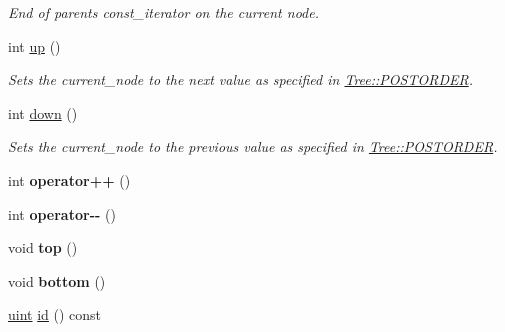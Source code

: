 \begin{DoxyCompactItemize}
\begin{DoxyCompactList}\small\item\em End of parents {\ttfamily const\+\_\+iterator} on the current node. \end{DoxyCompactList}\item 
int \hyperlink{classTreeIterator_adca1d999f093a69e2f5d044b358e5da7}{up} ()\hypertarget{classTreeIterator_adca1d999f093a69e2f5d044b358e5da7}{}\label{classTreeIterator_adca1d999f093a69e2f5d044b358e5da7}

\begin{DoxyCompactList}\small\item\em Sets the {\ttfamily current\+\_\+node} to the next value as specified in \hyperlink{classTree_a310e76b803db38e7067514822b21a58f}{Tree\+::\+P\+O\+S\+T\+O\+R\+D\+ER}. \end{DoxyCompactList}\item 
int \hyperlink{classTreeIterator_a8534adba213df8f7f1e67bf5005d902e}{down} ()\hypertarget{classTreeIterator_a8534adba213df8f7f1e67bf5005d902e}{}\label{classTreeIterator_a8534adba213df8f7f1e67bf5005d902e}

\begin{DoxyCompactList}\small\item\em Sets the {\ttfamily current\+\_\+node} to the previous value as specified in \hyperlink{classTree_a310e76b803db38e7067514822b21a58f}{Tree\+::\+P\+O\+S\+T\+O\+R\+D\+ER}. \end{DoxyCompactList}\item 
int {\bfseries operator++} ()\hypertarget{classTreeIterator_aed2ad905c7c0cef8c2fd8e012c67dc5c}{}\label{classTreeIterator_aed2ad905c7c0cef8c2fd8e012c67dc5c}

\item 
int {\bfseries operator-\/-\/} ()\hypertarget{classTreeIterator_a08d18c38de3157a78b9d02899a605ed8}{}\label{classTreeIterator_a08d18c38de3157a78b9d02899a605ed8}

\item 
void {\bfseries top} ()\hypertarget{classTreeIterator_a41f74b1ac47cd05ce7e08b46c93034f1}{}\label{classTreeIterator_a41f74b1ac47cd05ce7e08b46c93034f1}

\item 
void {\bfseries bottom} ()\hypertarget{classTreeIterator_a1c8244cded3c2a573d2914549a19e177}{}\label{classTreeIterator_a1c8244cded3c2a573d2914549a19e177}

\item 
\hyperlink{typedefs_8h_a91ad9478d81a7aaf2593e8d9c3d06a14}{uint} \hyperlink{classTreeIterator_a80badcbb276e0aa78216f5ef6ff91b62}{id} () const \hypertarget{classTreeIterator_a80badcbb276e0aa78216f5ef6ff91b62}{}\label{classTreeIterator_a80badcbb276e0aa78216f5ef6ff91b62}


\end{DoxyCompactItemize}
